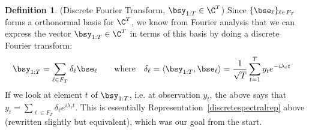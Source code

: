 \documentclass[12pt]{article}
\theoremstyle{plain}
\theoremstyle{definition}
\newtheorem{defn}[thm]{Definition}
\theoremstyle{remark}
\newcommand{\sumtT}{\sum^T_{t=1}}
\begin{document}

\clearpage
\begin{defn}(Discrete Fourier Transform, $\bsy_{1:T}\in\C^T$)
Since $\{\bse_\ell\}_{\ell\in F_T}$ forms a orthonormal basis for
$\C^T$, we know from Fourier analysis that we can express the vector
$\bsy_{1:T}\in\C^T$ in terms of this basis by doing a discrete Fourier
transform:
\begin{align*}
  \bsy_{1:T} &= \sum_{\ell\in F_T} \delta_\ell \bse_\ell
  \qquad
  \text{where}\quad
  \delta_\ell
  = \langle \bsy_{1:T},\bse_\ell \rangle
  = \frac{1}{\sqrt{T}}\sum_{t=1}^T y_t e^{-i\lambda_\ell t}
\end{align*}
If we look at element $t$ of $\bsy_{1:T}$, i.e. at observation $y_t$,
the above says that
$y_t = \sum_{\ell\in F_T} \delta_\ell e^{i\lambda_\ell t}$.
This is essentially Representation~\ref{discretespectralrep} above
(rewritten slightly but equivalent), which was our goal from the
start.
\end{defn}
\end{document}
